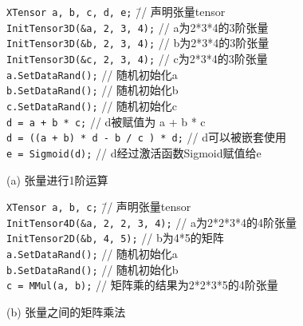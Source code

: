 \begin{tcolorbox}[enhanced,width=12cm,frame engine=empty,boxrule=0.1mm,size=title,colback=blue!10!white]
\begin{flushleft}
{\scriptsize
\begin{tabbing}
\texttt{XTensor a, b, c, d, e;} \hspace{9em} \= // 声明张量tensor \\
\texttt{InitTensor3D(\&a, 2, 3, 4);} \> // a为2*3*4的3阶张量 \\
\texttt{InitTensor3D(\&b, 2, 3, 4);} \> // b为2*3*4的3阶张量 \\
\texttt{InitTensor3D(\&c, 2, 3, 4);} \> // c为2*3*4的3阶张量 \\
\texttt{a.SetDataRand();} \> // 随机初始化a \\
\texttt{b.SetDataRand();} \> // 随机初始化b \\
\texttt{c.SetDataRand();} \> // 随机初始化c \\
\texttt{d = a + b * c;} \> // d被赋值为 a + b * c \\
\texttt{d = ((a + b) * d - b / c ) * d;} \> // d可以被嵌套使用 \\
\texttt{e = Sigmoid(d);} \> // d经过激活函数Sigmoid赋值给e
\end{tabbing}
}
\end{flushleft}
\end{tcolorbox}
\hspace{0.1in} \scriptsize{(a) 张量进行1阶运算}
\\
\begin{tcolorbox}[enhanced,width=12cm,frame engine=empty,boxrule=0.1mm,size=title,colback=blue!10!white]
\begin{flushleft}
{\scriptsize
\begin{tabbing}
\texttt{XTensor a, b, c;} \hspace{12.0em} \= // 声明张量tensor \\
\texttt{InitTensor4D(\&a, 2, 2, 3, 4);} \> // a为2*2*3*4的4阶张量 \\
\texttt{InitTensor2D(\&b, 4, 5);} \> // b为4*5的矩阵 \\
\texttt{a.SetDataRand();} \> // 随机初始化a \\
\texttt{b.SetDataRand();} \> // 随机初始化b \\
\texttt{c = MMul(a, b);} \> // 矩阵乘的结果为2*2*3*5的4阶张量
\end{tabbing}
}
\end{flushleft}
\end{tcolorbox}
\hspace{0.1in} \scriptsize{(b) 张量之间的矩阵乘法}

